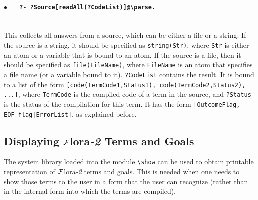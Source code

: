\documentclass[11pt]{article}
\newcommand{\FLORA}{{\mbox{\sc ${\cal F}${lora}\rm\emph{-2}}}\xspace}
\newcommand{\FLSYSTEM}{\FLORA}
\newcommand{\bs}{\textbackslash}
\begin{document}
  \paragraph{$\bullet$~~~\tt ?- ?Source[readAll(?CodeList)]@\bs{}parse.}~~\\
  This collects all answers from a source, which can be either a file or a
  string. If the source is a string, it should be
  specified as {\tt string(Str)}, where {\tt Str} is either an atom or a
  variable that is bound to an atom. If the source is a file, then it should
  be specified as {\tt file(FileName)}, where {\tt FileName} is an atom
  that specifies a file name (or a variable bound to it).
  {\tt ?CodeList} contains the result. It is bound to
  a list of the form {\tt [code(TermCode1,Status1), code(TermCode2,Status2),
    ...]}, where  
  {\tt TermCode} is the compiled code of a term in the source, and
  {\tt ?Status}  is the status of the compilation for this term. It has the
  form {\tt [OutcomeFlag, EOF\_flag|ErrorList]}, as explained before.

\subsection{Displaying \FLSYSTEM Terms and Goals}\label{sec-flrshow}

The system library loaded into the module \texttt{\bs{}show} can be used to
obtain printable representation of \FLSYSTEM terms and goals. This is
needed when one needs to show those terms to the user in a form that the
user can recognize (rather than in the internal form into which the terms
are compiled).
\end{document}
